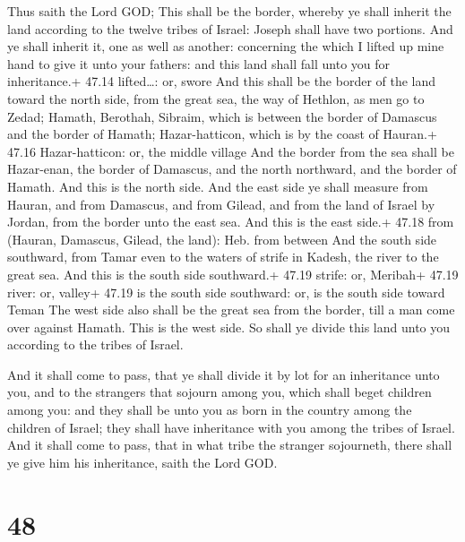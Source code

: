  Thus saith the Lord GOD; This shall be the border,
whereby ye shall inherit the land according to the twelve tribes of
Israel: Joseph shall have two portions.  And ye shall
inherit it, one as well as another: concerning the which I lifted up
mine hand to give it unto your fathers: and this land shall fall unto
you for inheritance.+ 47.14 lifted\ldots: or, swore  And
this shall be the border of the land toward the north side, from the
great sea, the way of Hethlon, as men go to Zedad;  Hamath,
Berothah, Sibraim, which is between the border of Damascus and the
border of Hamath; Hazar-hatticon, which is by the coast of Hauran.+
47.16 Hazar-hatticon: or, the middle village  And the
border from the sea shall be Hazar-enan, the border of Damascus, and the
north northward, and the border of Hamath. And this is the north side.
 And the east side ye shall measure from Hauran, and from
Damascus, and from Gilead, and from the land of Israel by Jordan, from
the border unto the east sea. And this is the east side.+ 47.18 from
(Hauran, Damascus, Gilead, the land): Heb. from between 
And the south side southward, from Tamar even to the waters of strife in
Kadesh, the river to the great sea. And this is the south side
southward.+ 47.19 strife: or, Meribah+ 47.19 river: or, valley+ 47.19 is
the south side southward: or, is the south side toward Teman
 The west side also shall be the great sea from the border,
till a man come over against Hamath. This is the west side.
 So shall ye divide this land unto you according to the
tribes of Israel.

 And it shall come to pass, that ye shall divide it by
lot for an inheritance unto you, and to the strangers that sojourn among
you, which shall beget children among you: and they shall be unto you as
born in the country among the children of Israel; they shall have
inheritance with you among the tribes of Israel.  And it
shall come to pass, that in what tribe the stranger sojourneth, there
shall ye give him his inheritance, saith the Lord GOD.

\hypertarget{section-47}{%
\section{48}\label{section-47}}

